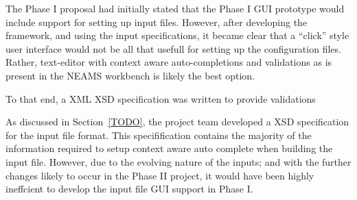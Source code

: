  The Phase I proposal had initially stated that the Phase I GUI prototype would include support for setting up input files. However, after developing the framework, and using the input specifications, it became clear that a ``click'' style user interface would not be all that usefull for setting up the configuration files. Rather, text-editor with context aware auto-completions and validations as is present in the NEAMS workbench is likely the best option. 
 
 To that end, a XML XSD specification was written to provide validations
 
 
 As discussed in Section~\ref{TODO}, the project team developed a XSD specification for the input file format. This specifification contains the majority of the information required to 
setup context aware auto complete when building the input file. However, due to the evolving nature of the inputs; and with the further changes likely to 
occur in the Phase II project, it would have been highly ineffcient to develop the input file GUI support in Phase I. 




